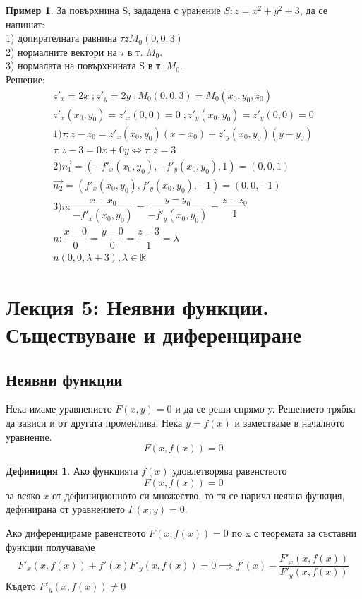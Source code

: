 \documentclass[a4paper,fleqn,12pt]{article}
\theoremstyle{definition}
\newtheorem{definition}{Дефиниция}[subsection]
\newtheorem{example}{Пример}[subsection]
\begin{document}
\begin{example}
За повърхнина S, зададена с уранение $S: z= x^2 + y^2 + 3$, да се напишат: \\
1) допирателната равнина $\tau z  M_0 (0, 0, 3)$ \\
2) нормалните вектори на $\tau$ в т. $M_0$.\\
3) нормалата на повърхнината S в т. $M_0$. \\
Решение:
\begin{gather*}
z'_x = 2x\; ; z'_y = 2y\; ; M_0(0,0,3) = M_0(x_0, y_0, z_0) \\
z'_x(x_0, y_0) = z'_x(0,0) = 0\; ; z'_y(x_0, y_0) = z'_y(0,0) = 0\\
1) \tau : z - z_0 = z'_x (x_0, y_0)(x - x_0) + z'_y (x_0, y_0)(y - y_0) \\
\tau : z - 3 = 0x + 0y \iff  \tau: z = 3\\
2)
\vec {n_1} = (-f'_x (x_0, y_0), -f'_y (x_0, y_0), 1) = (0, 0, 1) \\
\vec {n_2} = (f'_x (x_0, y_0), f'_y (x_0, y_0), -1) = (0, 0, -1) \\
3) 
n: \dfrac{x - x_0}{-f'_x (x_0, y_0)} = \dfrac{y-y_0}{-f'_y (x_0, y_0)} = \dfrac{z - z_0}{1} \\
n: \dfrac{x - 0}{0} = \dfrac{y-0}{0} = \dfrac{z - 3}{1} = \lambda \\
n (0, 0, \lambda + 3), \lambda \in \mathbb{R}
\end{gather*}
\end{example}

\newpage

\section{Лекция 5: Неявни функции. Съществуване и диференциране }

\subsection{Неявни функции}
Нека имаме уравнението $F(x,y) = 0$ и да се реши спрямо y. Решението трябва да зависи и от другата променлива. Нека $y = f(x)$ и заместваме в началното уравнение. 
$$F(x,f(x)) = 0$$

\begin{definition}
Ако функцията $f(x)$ удовлетворява равенството 
$$F(x,f(x)) = 0$$
за всяко $x$ от дефиниционното си множество, то тя се нарича неявна функция, дефинирана от уравнението $F(x;y) = 0$.
\end{definition}
Ако диференцираме равенството $F(x,f(x)) = 0$ по x с теоремата за съставни функции получаваме 
$$F'_x(x,f(x)) + f'(x)F'_y(x,f(x)) = 0 \implies f'(x) - \dfrac{F'_x(x,f(x))}{F'_y(x,f(x))}$$
Където $F'_y(x,f(x)) \neq 0$
\end{document}

